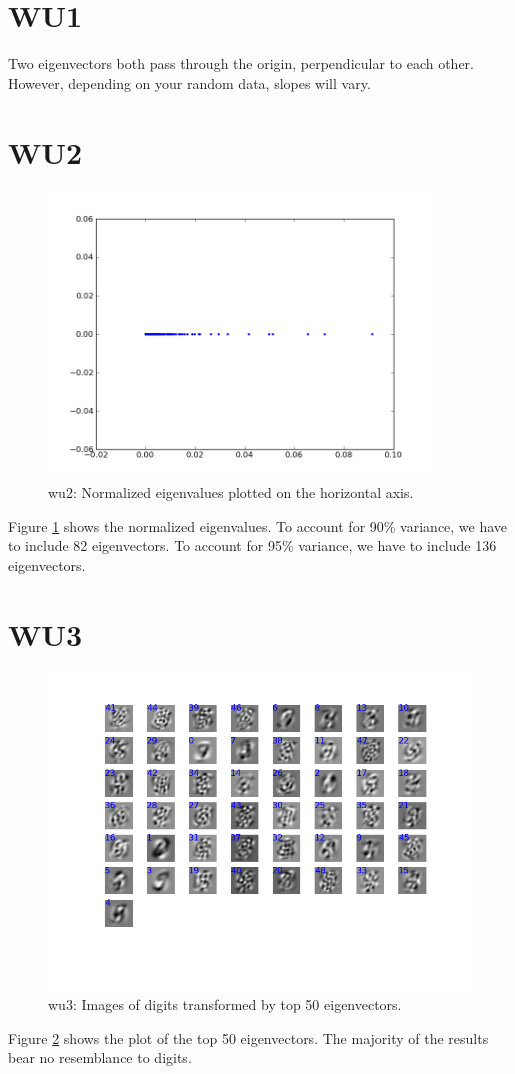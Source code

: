 \section*{WU1}
Two eigenvectors both pass through the origin, perpendicular to each other. However, depending on your random data, slopes will vary. 

\section*{WU2}

\begin{figure}[here]
	\center
	\caption{wu2: Normalized eigenvalues plotted on the horizontal axis. }
	\label{fig:wu2}
	\includegraphics[width=4.0in]{img/wu2.png}
\end{figure}
Figure \ref{fig:wu2} shows the normalized eigenvalues.
To account for 90\% variance, we have to include 82 eigenvectors.
To account for 95\% variance, we have to include 136 eigenvectors.


\section*{WU3}
\begin{figure}[here]
	\center
	\caption{wu3: Images of digits transformed by top 50 eigenvectors.}
	\label{fig:wu3}
	\includegraphics[width=6.0in]{img/wu3.png}
\end{figure}
Figure \ref{fig:wu3} shows the plot of the top 50 eigenvectors. The majority of the results bear no resemblance to digits. 